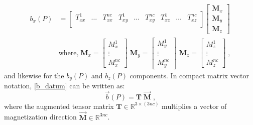 \begin{equation}\label{b_datum}
\begin{split}
	b_x(P) &=
	\begin{bmatrix}
	T_{xx}^1 &\hdots &T_{xx}^{nc} & T_{xy}^1 & \hdots & T_{xy}^{nc} & T_{xz}^1 & \hdots & T_{xz}^{nc}\\
	 \end{bmatrix}
	 \begin{bmatrix}
		\mathbf{M}_x \\ \mathbf{M}_y \\ \mathbf{M}_z
	\end{bmatrix} \\
	&\text{where,}\;
{\mathbf{ M}_x} = 
	\begin{bmatrix}
	M_x^1\\
	\vdots \\
	M_x^{nc} 
	\end{bmatrix}\;
	{\mathbf{M}_y} = 
	\begin{bmatrix}
	M_y^1\\
	\vdots \\
	M_y^{nc} 
	\end{bmatrix}\;
	{\mathbf{ M}_z} = 
	\begin{bmatrix}
	M_z^1\\
	\vdots \\
	M_z^{nc}  
	\end{bmatrix}\;,
	\end{split}
\end{equation}
and likewise for the $b_y(P)$ and $b_z(P)$ components.
In compact matrix vector notation, \ref{b_datum} can be written as:
\begin{equation} \label{Datum_b}
	\vec b(P) = \mathbf{T} \; \vec{\mathbf{M}} \;,
\end{equation}
where the augmented tensor matrix $\mathbf{T} \in \mathbb{R}^{3 \times (3nc)}$ multiplies a vector of magnetization direction  $\vec{\mathbf{M}}\in \mathbb{R}^{ 3nc}$.

